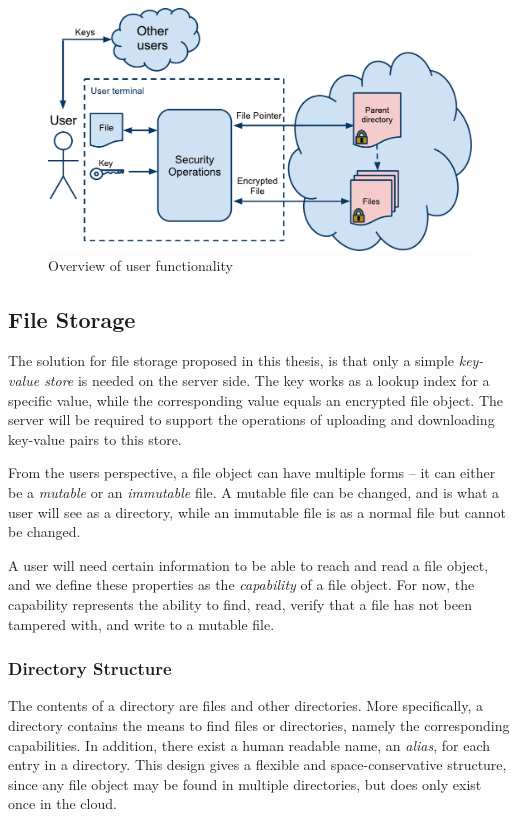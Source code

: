 \documentclass[pdftex,english,10pt,b5paper,twoside]{book}
\begin{document}
\begin{figure}[h!]
    \centering
    \includegraphics[width=\columnwidth]{ArchitectureOverview.pdf}
    \caption{Overview of user functionality}
    \label{fig:AS:overview}
\end{figure}

\subsection{File Storage}
\label{sec:AS:FS}

The solution for file storage proposed in this thesis, is that only a simple
\emph{key-value store} is needed on the server side. The key works as a lookup
index for a specific value, while the corresponding value equals an encrypted
file object. The server will be required to support the operations of uploading
and downloading key-value pairs to this store.

From the users perspective, a file object can have multiple forms -- it can
either be a \emph{mutable} or an \emph{immutable} file. A mutable file can be
changed, and is what a user will see as a directory, while an immutable file is
as a normal file but cannot be changed.

A user will need certain information to be able to reach and read a file
object, and we define these properties as the \emph{capability} of a file
object.  For now, the capability represents the ability to find, read, verify
that a file has not been tampered with, and write to a mutable file.

\subsubsection{Directory Structure}

The contents of a directory are files and other directories. More specifically,
a directory contains the means to find files or directories, namely the
corresponding capabilities. In addition, there exist a human readable name, an
\emph{alias}, for each entry in a directory. This design gives a flexible and
space-conservative structure, since any file object may be found in multiple
directories, but does only exist once in the cloud.
\end{document}
